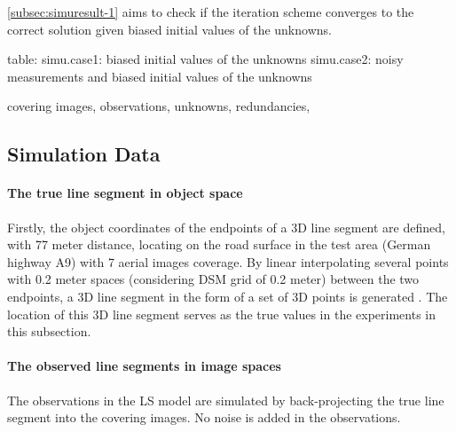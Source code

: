 \cref{subsec:simuresult-1} aims to check if the iteration scheme converges to the correct solution given biased initial values of the unknowns. %

table:
simu.case1: biased initial values of the unknowns
simu.case2: noisy measurements and biased initial values of the unknowns

covering images, observations, unknowns, redundancies, 




\subsection{Simulation Data}
\label{subsec:simudata}

\paragraph{The true line segment in object space}
Firstly, the object coordinates of the endpoints of a 3D line segment are defined, with 77 meter distance, locating on the road surface in the test area (German highway A9) with 7 aerial images coverage. By linear interpolating several points with 0.2 meter spaces (considering DSM grid of 0.2 meter) between the two endpoints, a 3D line segment in the form of a set of 3D points is generated .
The location of this 3D line segment serves as the true values in the experiments in this subsection. 

\paragraph{The observed line segments in image spaces}
The observations in the LS model are simulated by back-projecting the true line segment into the covering images. No noise is added in the observations.

